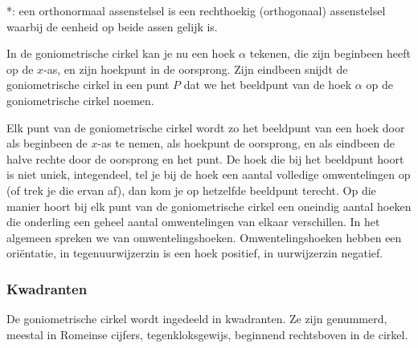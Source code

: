 \begin{figure}[H]
	\centering 
	 
\end{figure}
  
*: een orthonormaal assenstelsel is een rechthoekig (orthogonaal) assenstelsel waarbij de eenheid op beide assen gelijk is.

In de goniometrische cirkel kan je nu een hoek $\alpha$ tekenen, die zijn beginbeen heeft op de $x$-as, en zijn hoekpunt in de oorsprong. Zijn eindbeen snijdt de goniometrische cirkel in een punt $P$ dat we het beeldpunt van de hoek $\alpha$ op de goniometrische cirkel noemen.

\begin{figure}[H]
	\centering 
	 
\end{figure}

Elk punt van de goniometrische cirkel wordt zo het beeldpunt van een hoek door als beginbeen de $x$-as te nemen, als hoekpunt de oorsprong, en als eindbeen de halve rechte door de oorsprong en het punt. De hoek die bij het beeldpunt hoort is niet uniek, integendeel, tel je bij de hoek een aantal volledige omwentelingen op (of trek je die ervan af), dan kom je op hetzelfde beeldpunt terecht. Op die manier hoort bij elk punt van de goniometrische cirkel een oneindig aantal hoeken die onderling een geheel aantal omwentelingen van elkaar verschillen.
In het algemeen spreken we van omwentelingshoeken. Omwentelingshoeken hebben een oriëntatie, in tegenuurwijzerzin is een hoek positief, in uurwijzerzin negatief.


\begin{figure}[H]
	\centering
	
\end{figure}


\subsubsection{Kwadranten}

De goniometrische cirkel wordt ingedeeld in kwadranten.
Ze zijn genummerd, meestal in Romeinse cijfers, tegenkloksgewijs, beginnend rechtsboven in de cirkel.

\begin{figure}[H]
	\centering
	
\end{figure}

